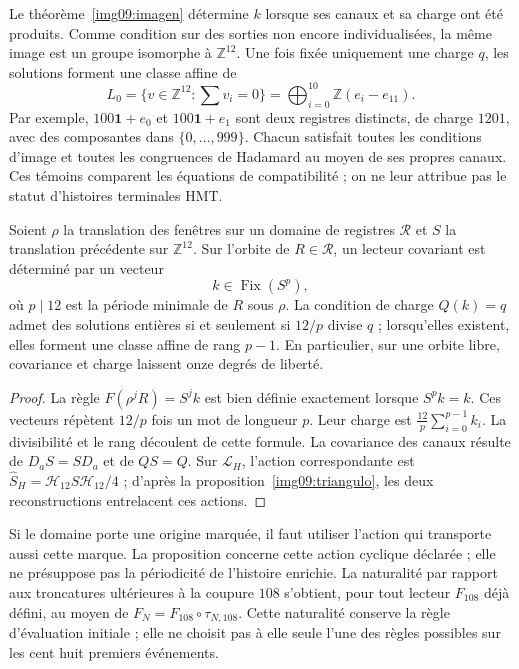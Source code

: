 Le théorème~\ref{img09:imagen} détermine $k$ lorsque ses
canaux et sa charge ont été produits. Comme condition sur des sorties non encore
individualisées, la même image est un groupe isomorphe à
$\mathbb Z^{12}$. Une fois fixée uniquement une charge $q$, les solutions
forment une classe affine de
\[
 L_0=\{v\in\mathbb Z^{12}:\sum v_i=0\}
 =\bigoplus_{i=0}^{10}\mathbb Z(e_i-e_{11}).
\]
Par exemple, $100\mathbf1+e_0$ et $100\mathbf1+e_1$ sont deux
registres distincts, de charge $1201$, avec des composantes dans
$\{0,\ldots,999\}$. Chacun satisfait toutes les conditions
d'image et toutes les congruences de Hadamard au moyen de ses propres
canaux. Ces témoins comparent les équations de compatibilité ;
on ne leur attribue pas le statut d'histoires terminales HMT.

\begin{proposition}
\label{img09:covariancia}
Soient $\rho$ la translation des fenêtres sur un domaine de registres
$\mathscr R$ et $S$ la translation précédente sur $\mathbb Z^{12}$.
Sur l'orbite de $R\in\mathscr R$, un lecteur covariant est
déterminé par un vecteur
\[
 k\in\operatorname{Fix}(S^p),
\]
où $p\mid12$ est la période minimale de $R$ sous $\rho$.
La condition de charge $Q(k)=q$ admet des solutions entières si et seulement si
$12/p$ divise $q$ ; lorsqu'elles existent, elles forment une classe affine de rang
$p-1$. En particulier, sur une orbite libre, covariance et charge
laissent onze degrés de liberté.
\end{proposition}
\begin{proof}
La règle $F(\rho^jR)=S^jk$ est bien définie exactement lorsque
$S^pk=k$. Ces vecteurs répètent $12/p$ fois un mot de
longueur $p$. Leur charge est $\frac{12}{p}\sum_{i=0}^{p-1}k_i$.
La divisibilité et le rang découlent de cette formule. La
covariance des canaux résulte de $D_aS=SD_a$ et de $QS=Q$.
Sur $\mathcal L_H$, l'action correspondante est
$\widehat S_H=\mathcal H_{12}S\mathcal H_{12}/4$ ;
d'après la proposition~\ref{img09:triangulo}, les deux reconstructions
entrelacent ces actions.
\end{proof}

Si le domaine porte une origine marquée, il faut utiliser l'action qui
transporte aussi cette marque. La proposition concerne cette action
cyclique déclarée ; elle ne présuppose pas la périodicité de l'histoire
enrichie. La naturalité par rapport aux troncatures ultérieures à la coupure
$108$ s'obtient, pour tout lecteur $F_{108}$ déjà défini, au moyen de
$F_N=F_{108}\circ\tau_{N,108}$. Cette naturalité conserve la règle
d'évaluation initiale ; elle ne choisit pas à elle seule l'une des règles possibles
sur les cent huit premiers événements.

